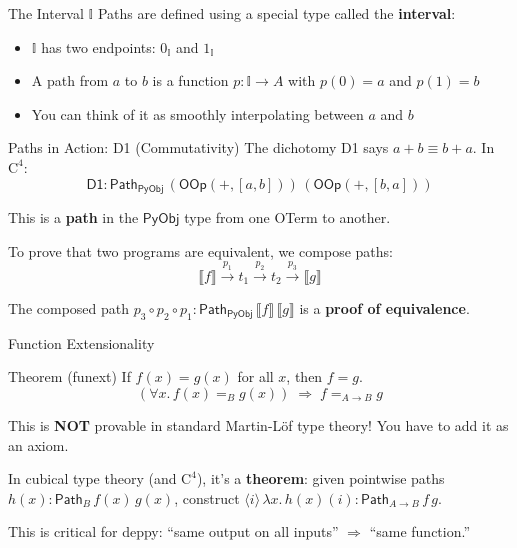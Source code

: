 \documentclass[aspectratio=169,11pt]{beamer}
\newcommand{\Cfour}{\mathrm{C}^4}
\newcommand{\Path}{\mathsf{Path}}
\newcommand{\PyObj}{\mathsf{PyObj}}
\newcommand{\interval}{\mathbb{I}}
\newcommand{\den}[1]{\llbracket #1 \rrbracket}
\begin{document}
\begin{frame}{The Interval $\interval$}
Paths are defined using a special type called the \textbf{interval}:

\begin{itemize}
\item $\interval$ has two endpoints: $0_\interval$ and $1_\interval$
\item A path from $a$ to $b$ is a function $p : \interval \to A$ with
  $p(0) = a$ and $p(1) = b$
\item You can think of it as smoothly interpolating between $a$ and $b$
\end{itemize}

\begin{center}
\end{center}
\end{frame}

\begin{frame}{Paths in Action: D1 (Commutativity)}
The dichotomy D1 says $a + b \equiv b + a$. In $\Cfour$:
\[
  \mathsf{D1} : \Path_\PyObj\,
  (\mathsf{OOp}(+, [a, b]))\,
  (\mathsf{OOp}(+, [b, a]))
\]

This is a \textbf{path} in the $\PyObj$ type from one OTerm to another.

\vspace{0.5em}
To prove that two programs are equivalent, we compose paths:
\[
  \den{f} \xrightarrow{p_1} t_1 \xrightarrow{p_2} t_2
  \xrightarrow{p_3} \den{g}
\]

The composed path $p_3 \circ p_2 \circ p_1 : \Path_\PyObj\, \den{f}\, \den{g}$
is a \textbf{proof of equivalence}.
\end{frame}

\begin{frame}{Function Extensionality}
\begin{block}{Theorem (funext)}
If $f(x) = g(x)$ for all $x$, then $f = g$.
\[
  (\forall x.\, f(x) =_B g(x)) \;\Rightarrow\; f =_{A \to B} g
\]
\end{block}

This is \textbf{NOT} provable in standard Martin-L\"of type theory!
You have to add it as an axiom.

In cubical type theory (and $\Cfour$), it's a \textbf{theorem}:
given pointwise paths $h(x) : \Path_B\, f(x)\, g(x)$,
construct $\langle i \rangle\, \lambda x.\, h(x)(i) : \Path_{A \to B}\, f\, g$.

\vspace{0.5em}
This is critical for deppy: ``same output on all inputs'' $\Rightarrow$ ``same function.''
\end{frame}
\end{document}
